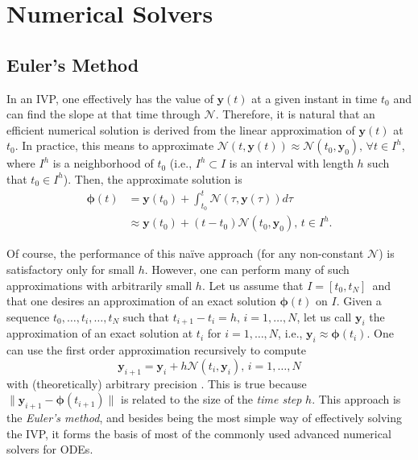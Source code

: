 \section{Numerical Solvers}

\subsection{Euler's Method}

In an \gls{IVP}, one effectively has the value of $\bm{y}\left( t \right) $ at a given instant in time $t_0$ and can find the slope at that time through $\mathcal{N}$.
Therefore, it is natural that an efficient numerical solution is derived from the linear approximation of $\bm{y}\left( t \right) $ at $t_0$.
In practice, this means to approximate $\mathcal{N}\left( t, \bm{y}\left( t \right) \right) \approx \mathcal{N}\left( t_0, \bm{y}_0 \right),\,\forall t\in I^h $, where $I^h$ is a neighborhood of $t_0$ (i.e., $I^h \subset I$ is an interval with length $h$ such that $t_0\in I^h$).
Then, the approximate solution is
\begin{align*}
    \bm{\phi}\left( t \right) &= \bm{y}\left( t_0 \right) + \int_{t_0}^{t}\mathcal{N}\left( \tau, \bm{y}\left( \tau \right) \right)d\tau \\
    &\approx \bm{y}\left( t_0 \right) + \left( t-t_0 \right)\mathcal{N}\left( t_0, \bm{y}_0 \right),\,t\in I^h
.\end{align*}

Of course, the performance of this naïve approach (for any non-constant $\mathcal{N}$) is satisfactory only for small $h$.
However, one can perform many of such approximations with arbitrarily small $h$.
Let us assume that $I=\left[ t_0,t_N \right]$\footnotemark\, and that one desires an approximation of an exact solution $\bm{\phi}\left( t \right) $ on $I$.
Given a sequence $t_0,\ldots,t_i,\ldots,t_N$ such that $t_{i+1}-t_i=h,\,i=1,\ldots,N$, let us call $\bm{y}_{i}$ the approximation of an exact solution at $t_i$ for $i=1,\ldots,N$, i.e., $\bm{y}_{i}\approx \bm{\phi}(t_i)$.
One can use the first order approximation recursively to compute \[
\bm{y}_{i+1} = \bm{y}_{i} + h\mathcal{N}\left( t_i, \bm{y}_i \right),\,i=1,\ldots,N
\] with (theoretically) arbitrary precision \cite{iserles_first_2008}.
This is true because $\|\bm{y}_{i+1}-\bm{\phi}(t_{i+1})\|$ is related to the size of the \textit{time step} $h$.
This approach is the \emph{Euler's method}, and besides being the most simple way of effectively solving the \gls{IVP}, it forms the basis of most of the commonly used advanced numerical solvers for \gls{ODE}s.

